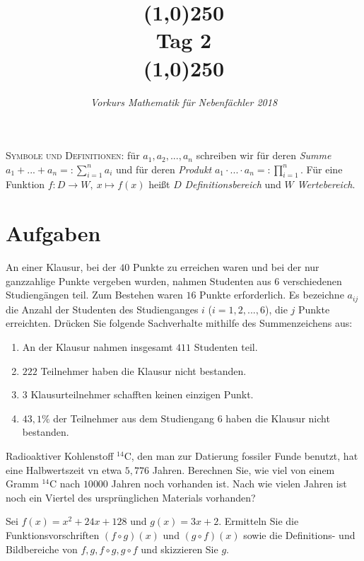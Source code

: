\documentclass[11pt]{article}
\begin{document}
\title{\line(1,0){250}\\Tag 2\\\line(1,0){250}}
\date{}
\author{\itshape Vorkurs Mathematik für Nebenfächler 2018}
\maketitle
\begin{framed}
	\noindent \scriptsize
	\textsc{Symbole und Definitionen:} für $a_1,a_2,...,a_n$ schreiben wir für deren \emph{Summe} $a_1+...+a_n=:\sum_{i=1}^n a_i$ und für deren \emph{Produkt} $a_1\cdot...\cdot a_n =: \prod_{i=1}^n$. Für eine Funktion $f:D\to W,~x\mapsto f(x)$ heißt $D$ \emph{Definitionsbereich} und $W$ \emph{Wertebereich}.
\end{framed}
\section*{Aufgaben}
\begin{task}
An einer Klausur, bei der $40$ Punkte zu erreichen waren und bei der nur ganzzahlige Punkte
vergeben wurden, nahmen Studenten aus $6$ verschiedenen Studieng\"angen teil. Zum Bestehen
waren $16$ Punkte erforderlich. Es bezeichne $a_{ij}$ die Anzahl der Studenten des Studienganges
$i$ ($i = 1, 2, . . ., 6$), die $j$ Punkte erreichten. Dr\"ucken Sie folgende Sachverhalte mithilfe des
Summenzeichens aus:
\begin{enumerate}
	\item An der Klausur nahmen insgesamt $411$ Studenten teil.
	\item $222$ Teilnehmer haben die Klausur nicht bestanden.
	\item $3$ Klausurteilnehmer schafften keinen einzigen Punkt.
	\item $43,1 \%$ der Teilnehmer aus dem Studiengang $6$ haben die Klausur nicht bestanden.
\end{enumerate}
\end{task}
\begin{task}
	Radioaktiver Kohlenstoff $^{14}$C, den man zur Datierung fossiler Funde
	benutzt, hat eine Halbwertszeit vn etwa $5,776$ Jahren. Berechnen Sie, wie viel
	von einem Gramm $^{14}$C nach $10 000$ Jahren noch vorhanden ist. Nach wie vielen Jahren ist noch ein Viertel des ursprünglichen Materials vorhanden?
\end{task}
\begin{task}
Sei $f(x)=x^2+24x+128$ und $g(x)=3x+2$. Ermitteln Sie die Funktionsvorschriften $(f \circ g)(x)$ und $(g \circ f)(x)$ sowie die Definitions- und Bildbereiche von $f, g, f \circ g, g \circ f$ und skizzieren Sie $g$.
\end{task}
\end{document}
